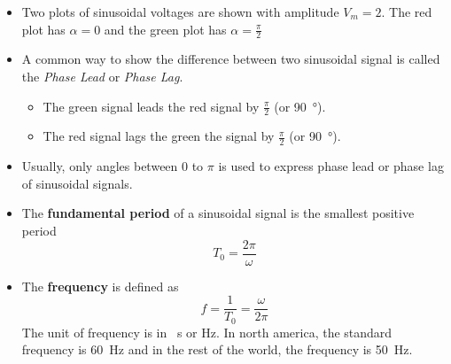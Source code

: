 \documentclass{article}
\begin{document}
\begin{itemize}
    \item Two plots of sinusoidal voltages are shown with amplitude $V_m=2$. The red plot has $\alpha=0$ and the green plot has $\alpha=\frac{\pi}{2}$
    \item A common way to show the difference between two sinusoidal signal is called the \textit{Phase Lead} or \textit{Phase Lag}. 
    \begin{itemize}
        \item The green signal leads the red signal by $\frac{\pi}{2}$ (or \SI{90}{\degree}). 
        \item The red signal lags the green the signal by $\frac{\pi}{2}$ (or \SI{90}{\degree}).
    \end{itemize}
    \item Usually, only angles between $0$ to $\pi$ is used to express phase lead or phase lag of sinusoidal signals.
\end{itemize}
\begin{definition}
    \begin{itemize}
        \item The \textbf{fundamental period} of a sinusoidal signal is the smallest positive period
        \begin{equation}
            T_0=\frac{2\pi}{\omega}
        \end{equation}
        \item The \textbf{frequency} is defined as 
        \begin{equation}
            f=\frac{1}{T_0}=\frac{\omega}{2\pi}
        \end{equation}
        The unit of frequency is in \si{\per\second} or \si{\hertz}. In north america, the standard frequency is \SI{60}{\hertz} and in the rest of the world, the frequency is \SI{50}{\hertz}.
    \end{itemize}
\end{definition}
\end{document}
